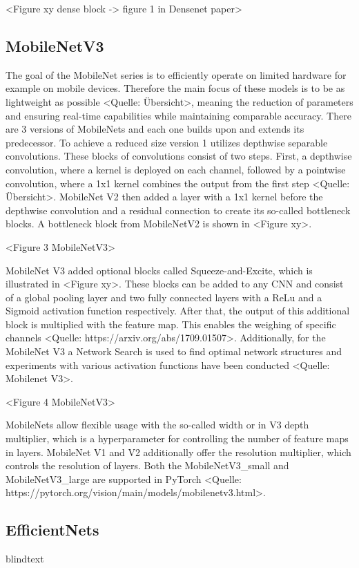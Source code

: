 \vspace{1cm}

<Figure xy dense block -> figure 1 in Densenet paper>

\subsection{MobileNetV3}

The goal of the MobileNet series is to efficiently operate on limited hardware for example on mobile devices.
Therefore the main focus of these models is to be as lightweight as possible <Quelle: Übersicht>, meaning the reduction of parameters and ensuring real-time capabilities while maintaining comparable accuracy.
There are 3 versions of MobileNets and each one builds upon and extends its predecessor.
To achieve a reduced size version 1 utilizes depthwise separable convolutions.
These blocks of convolutions consist of two steps. First, a depthwise convolution, where a kernel is deployed on each channel, followed by a pointwise convolution, where a 1x1 kernel combines the output from the first step <Quelle: Übersicht>.
MobileNet V2 then added a layer with a 1x1 kernel before the depthwise convolution and a residual connection to create its so-called bottleneck blocks.
A bottleneck block from MobileNetV2 is shown in <Figure xy>.

\vspace{1cm}
<Figure 3 MobileNetV3>
\vspace{1cm}

MobileNet V3 added optional blocks called Squeeze-and-Excite, which is illustrated in <Figure xy>. 
These blocks can be added to any CNN and consist of a global pooling layer and two fully connected layers with a ReLu and a Sigmoid activation function respectively.
After that, the output of this additional block is multiplied with the feature map.
This enables the weighing of specific channels <Quelle: https://arxiv.org/abs/1709.01507>.
Additionally, for the MobileNet V3 a Network Search is used to find optimal network structures and experiments with various activation functions have been conducted <Quelle: Mobilenet V3>.

\vspace{1cm}
<Figure 4 MobileNetV3>
\vspace{1cm}

MobileNets allow flexible usage with the so-called width or in V3 depth multiplier, which is a hyperparameter for controlling the number of feature maps in layers.
MobileNet V1 and V2 additionally offer the resolution multiplier, which controls the resolution of layers.
Both the MobileNetV3\_small and MobileNetV3\_large are supported in PyTorch <Quelle: https://pytorch.org/vision/main/models/mobilenetv3.html>.

\subsection{EfficientNets}

blindtext

